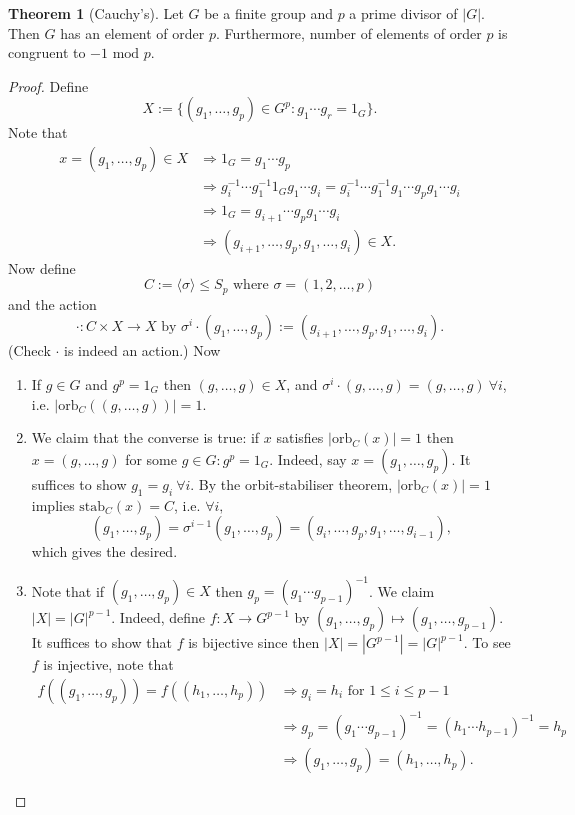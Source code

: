 \documentclass[a4paper]{article}
\newcommand{\orb}{\text{orb}}
\newcommand{\stab}{\text{stab}}
\newcommand{\Mod}{\text{ mod }}
\theoremstyle{definition}
\newtheorem{thm}[defn]{Theorem}
\begin{document}
\begin{thm}[Cauchy's]
Let $G$ be a finite group and $p$ a prime divisor of $|G|$. Then $G$ has an element of order $p$. Furthermore, number of elements of order $p$ is congruent to $-1\Mod p$.
\end{thm}
\begin{proof}
Define
\[
X:=\{(g_1,\ldots,g_p)\in G^p:g_1\cdots g_r=1_G\}.
\]
Note that
\[
\begin{aligned}
x=(g_1,\ldots,g_p)\in X &\Rightarrow 1_G=g_1\cdots g_p \\
&\Rightarrow g_i^{-1}\cdots g_1^{-1} 1_G g_1\cdots g_i=g_i^{-1}\cdots g_1^{-1} g_1\cdots g_p g_1\cdots g_i \\
&\Rightarrow 1_G=g_{i+1}\cdots g_pg_1\cdots g_i \\
&\Rightarrow (g_{i+1},\ldots ,g_p,g_1,\ldots ,g_i)\in X.
\end{aligned}
\]
Now define
\[
C:=\langle\sigma\rangle\leq S_p \text{ where }\sigma=(1,2,\ldots,p)
\]
and the action
\[
\cdot :C\times X\rightarrow X \text{ by } \sigma^i\cdot (g_1,\ldots,g_p):=(g_{i+1},\ldots ,g_p,g_1,\ldots ,g_i).
\]
(Check $\cdot$ is indeed an action.) Now
\begin{enumerate}
\item If $g\in G$ and $g^p=1_G$ then $(g,\ldots,g)\in X$, and $\sigma^i\cdot(g,\ldots,g)=(g,\ldots,g) \ \forall i$, i.e. $|\orb_C((g,\ldots,g))|=1$.
\item We claim that the converse is true: if $x$ satisfies $|\orb_C(x)|=1$ then $x=(g,\ldots,g)$ for some $g\in G : g^p=1_G$. Indeed, say $x=(g_1,\ldots,g_p)$. It suffices to show $g_1=g_i \ \forall i$. By the orbit-stabiliser theorem, $|\orb_C(x)|=1$ implies $\stab_C(x)=C$, i.e. $\forall i,$
\[
(g_1,\ldots,g_p)=\sigma^{i-1}(g_1,\ldots,g_p)=(g_i,\ldots ,g_p,g_1,\ldots ,g_{i-1}),
\]
which gives the desired.
\item Note that if $(g_1,\ldots,g_p)\in X$ then $g_p=(g_1\cdots g_{p-1})^{-1}$. We claim $|X|=|G|^{p-1}$. Indeed, define $f:X\rightarrow G^{p-1}$ by $(g_1,\ldots,g_p)\mapsto (g_1,\ldots,g_{p-1})$. It suffices to show that $f$ is bijective since then $|X|=|G^{p-1}|=|G|^{p-1}$. To see $f$ is injective, note that
\[
\begin{aligned}
f((g_1,\ldots,g_p))=f((h_1,\ldots,h_p)) &\Rightarrow g_i=h_i \text{ for } 1\leq i\leq p-1 \\
&\Rightarrow g_p=(g_1\cdots g_{p-1})^{-1}=(h_1\cdots h_{p-1})^{-1}=h_p \\
&\Rightarrow (g_1,\ldots,g_p)=(h_1,\ldots,h_p).
\end{aligned}
\]
\end{enumerate}
\end{proof}
\end{document}
